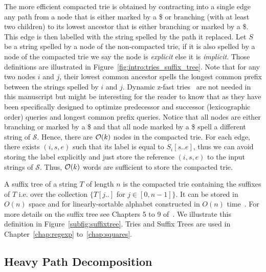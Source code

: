 The more efficient compacted trie is obtained by contracting  into a single edge any path from a node that is either marked by a \$ or branching (with at least two children) to its lowest ancestor that is either branching or marked by a \$.
This edge is then labelled with the string spelled by the path it replaced.
Let $S$ be a string spelled by a node of the non-compacted trie, if it is also spelled by a node of the compacted trie we say the node is \emph{explicit} else it is \emph{implicit}. Those definitions are illustrated in Figure~\ref{fig:intro:tries_suffix_tree}. Note that for any two nodes $i$ and $j$, their lowest common ancestor spells the longest common prefix between the strings spelled by $i$ and $j$.
Dynamic z-fast tries~\cite{belazzougui2010dynamic} are not needed in this manuscript but might be interesting for the reader to know that as they have been specifically designed to optimize predecessor and successor (lexicographic order) queries and longest common prefix queries.
%
Notice that all nodes are either branching or marked by a \$ and that all node marked by a \$ spell a different string of $\mathcal{S}$. 
Hence, there are $\mathcal{O}(k)$ nodes in the compacted trie.
For each edge, there exists $(i,s,e)$ such that its label is equal to $S_i[s .. e]$, thus we can avoid storing the label explicitly and just store the reference $(i,s,e)$ to the input strings of $\mathcal{S}$.
Thus, $\mathcal{O}(k)$ words are sufficient to store the compacted trie.
%


A suffix tree of a string $T$ of length $n$ is the compacted trie containing the suffixes of $T$ i.e. over the collection $\{T[j..]$ for $ j \in [0,n-1] \}$. It can be stored in $O(n)$ space and for linearly-sortable alphabet constructed in $O(n)$ time~\cite{Farach1997}. For more details on the suffix tree see Chapters 5 to 9 of~\cite{Gusfield1997}. We illustrate this definition in Figure~\ref{subfig:suffixtree}. Tries and Suffix Trees are used in Chapter~\ref{chap:regexp} to~\ref{chap:squares}.



\subsection{Heavy Path Decomposition}\label{sec:prelim:HP}

